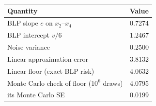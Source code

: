\begin{center}
\small
\setlength{\tabcolsep}{4pt}
\begin{tabular}{lr}
\toprule
Quantity & Value \\
\midrule
BLP slope $c$ on $x_2$--$x_4$ & 0.7274 \\
BLP intercept $v/6$ & 1.2467 \\
Noise variance & 0.2500 \\
Linear approximation error & 3.8132 \\
Linear floor (exact BLP risk) & 4.0632 \\
Monte Carlo check of floor ($10^6$ draws) & 4.0795 \\
\quad its Monte Carlo SE & 0.0199 \\
\bottomrule
\end{tabular}
\end{center}

